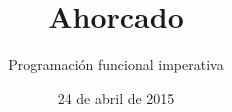 \documentclass{beamer}
\title{Ahorcado}
\subtitle{Programación funcional imperativa}
\author{}
\institute{Stack Builders}
\date{24 de abril de 2015}
\begin{document}

\frame{\titlepage}

\end{document}

